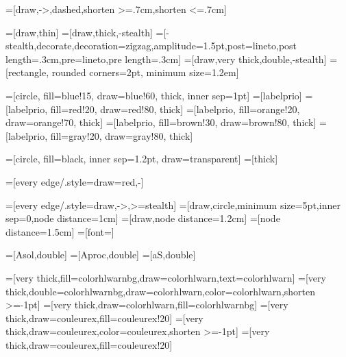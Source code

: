 =[draw,->,dashed,shorten >=.7cm,shorten <=.7cm]

=[draw,thin]%
=[draw,thick,-stealth]
=[-stealth,decorate,decoration={zigzag,amplitude=1.5pt,post=lineto,post length=.3cm,pre=lineto,pre length=.3cm}]
=[draw,very thick,double,-stealth]
=[rectangle, rounded corners=2pt, minimum size=1.2em]


=[circle, fill=blue!15, draw=blue!60, thick, inner sep=1pt]
=[labelprio]
=[labelprio, fill=red!20, draw=red!80, thick]
=[labelprio, fill=orange!20, draw=orange!70, thick]
=[labelprio, fill=brown!30, draw=brown!80, thick]
=[labelprio, fill=gray!20, draw=gray!80, thick]

=[circle, fill=black, inner sep=1.2pt, draw=transparent]
=[thick]

=[every edge/.style={draw=red,-}]

=[every edge/.style={draw,->,>=stealth}]
=[draw,circle,minimum size=5pt,inner sep=0,node distance=1cm]
=[draw,node distance=1.2cm]
=[node distance=1.5cm]
=[font=\Large]

=[Asol,double]
=[Aproc,double]
=[aS,double]

=[very thick,fill=colorhlwarnbg,draw=colorhlwarn,text=colorhlwarn]
=[very thick,double=colorhlwarnbg,draw=colorhlwarn,color=colorhlwarn,shorten >=-1pt]
=[very thick,draw=colorhlwarn,fill=colorhlwarnbg]
=[very thick,draw=couleurex,fill=couleurex!20]
=[very thick,draw=couleurex,color=couleurex,shorten >=-1pt]
=[very thick,draw=couleurex,fill=couleurex!20]







